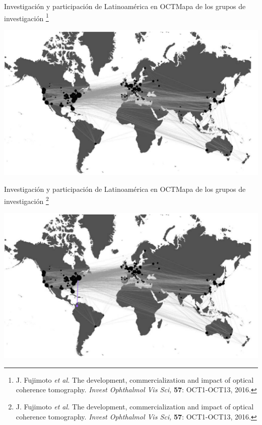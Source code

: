 \documentclass[fleqn,10pt]{beamer}
\newcommand\blfootnote[1]{%
	\begingroup
	\renewcommand\thefootnote{}\footnote{#1}%
	\addtocounter{footnote}{-1}%
	\endgroup
}
\begin{document}
\begin{frame}{Investigación y participación de Latinoamérica en OCT}{Mapa de los grupos de investigación}
	\blfootnote{\tiny{J. Fujimoto \emph{et al.} The development, commercialization and impact of optical coherence tomography. \emph{Invest Ophthalmol Vis Sci,} \textbf{57}: OCT1-OCT13, 2016.}}
	\includegraphics[width=1\linewidth]{AAUgraphics/pt1/oct_groups_2015}
\end{frame}

\addtocounter{framenumber}{-1}
\begin{frame}{Investigación y participación de Latinoamérica en OCT}{Mapa de los grupos de investigación}
	\blfootnote{\tiny{J. Fujimoto \emph{et al.} The development, commercialization and impact of optical coherence tomography. \emph{Invest Ophthalmol Vis Sci,} \textbf{57}: OCT1-OCT13, 2016.}}
	\includegraphics[width=1\linewidth]{AAUgraphics/pt1/Maps_2}
\end{frame}
\end{document}
